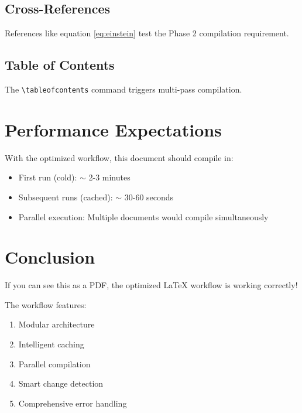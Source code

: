 \documentclass{article}
\begin{document}
\subsection{Cross-References}
References like equation \ref{eq:einstein} test the Phase 2 compilation requirement.

\subsection{Table of Contents}
The \texttt{\textbackslash tableofcontents} command triggers multi-pass compilation.

\section{Performance Expectations}

With the optimized workflow, this document should compile in:
\begin{itemize}
    \item First run (cold): $\sim$ 2-3 minutes
    \item Subsequent runs (cached): $\sim$ 30-60 seconds
    \item Parallel execution: Multiple documents would compile simultaneously
\end{itemize}

\section{Conclusion}

If you can see this as a PDF, the optimized LaTeX workflow is working correctly!

The workflow features:
\begin{enumerate}
    \item Modular architecture
    \item Intelligent caching
    \item Parallel compilation
    \item Smart change detection
    \item Comprehensive error handling
\end{enumerate}
\end{document}
